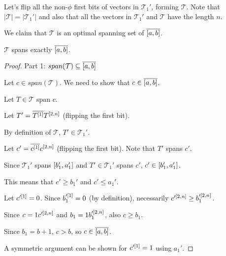 \documentclass{article}
\begin{document}
Let's flip all the non-$\phi$ first bits
of vectors in $\mathcal{T}_1'$,
forming $\mathcal{T}$.
Note that $|\mathcal{T}| = |\mathcal{T}_1'|$
and also that all the vectors in $\mathcal{T}_1'$
and $\mathcal{T}$ have the length $n$.

We claim that $\mathcal{T}$ is an optimal spanning set
of $\overline{[a, b]}$.

\begin{theorem} \label{diffsound}
$\mathcal{T}$ spans exactly $\overline{[a, b]}$.
\end{theorem}

\begin{proof}
Part 1: $span(\mathcal{T}) \subseteq \overline{[a, b]}$

Let $c \in span(\mathcal{T})$.
We need to show that $c \in \overline{[a, b]}$.

Let $T \in \mathcal{T}$ span $c$.

Let $T' = \overline{T^{[1]}} T^{[2, n]}$
(flipping the first bit).

By definition of $\mathcal{T}$,
$T' \in \mathcal{T}_1'$.

Let $c' = \overline{c^{[1]}} c^{[2, n]}$
(flipping the first bit).
Note that $T'$ spans $c'$.

Since $\mathcal{T}_1'$ spans $[b_1', a_1']$
and $T' \in \mathcal{T}_1'$ spans $c'$,
$c' \in [b_1', a_1']$.

This means that $c' \geq b_1'$ and $c' \leq a_1'$.

Let $c'^{[1]} = 0$.
Since $b_1'^{[1]} = 0$ (by definition),
necessarily $c'^{[2, n]} \geq b_1'^{[2, n]}$.

Since $c = 1 c'^{[2, n]}$
and $b_1 = 1 b_1'^{[2, n]}$,
also $c \geq b_1$.

Since $b_1 = b + 1$,
$c > b$,
so $c \in \overline{[a, b]}$.

A symmetric argument can be shown for $c'^{[1]} = 1$
using $a_1'$.
\end{proof}
\end{document}
